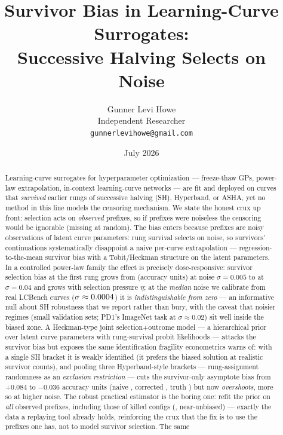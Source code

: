 \documentclass[10pt]{article}
\title{Survivor Bias in Learning-Curve Surrogates:\\
Successive Halving Selects on Noise}
\author{Gunner Levi Howe\\
Independent Researcher\\
\texttt{gunnerlevihowe@gmail.com}}
\date{July 2026}
\begin{document}
\maketitle

\begin{abstract}
Learning-curve surrogates for hyperparameter optimization --- freeze-thaw
GPs, power-law extrapolation, in-context learning-curve networks --- are
fit and deployed on curves that \emph{survived} earlier rungs of
successive halving (SH), Hyperband, or ASHA, yet no method in this line
models the censoring mechanism. We state the honest crux up front:
selection acts on \emph{observed} prefixes, so if prefixes were noiseless
the censoring would be ignorable (missing at random). The bias enters
because prefixes are noisy observations of latent curve parameters: rung
survival selects on noise, so survivors' continuations systematically
disappoint a naive per-curve extrapolation --- regression-to-the-mean
survivor bias with a Tobit/Heckman structure on the latent parameters. In
a controlled power-law family the effect is precisely dose-responsive:
survivor selection bias at the first rung grows from \GateBiasSigLo{}
(accuracy units) at noise $\sigma = 0.005$ to \GateBiasSigXhi{} at
$\sigma = 0.04$ and grows with selection pressure $\eta$; at the
\emph{median} noise we calibrate from real LCBench curves
($\sigma \approx 0.0004$) it is \emph{indistinguishable from zero}
--- an informative null about SH robustness that we report rather than
bury, with the caveat that noisier regimes (small validation sets;
PD1's ImageNet task at $\sigma \approx 0.02$) sit well inside the
biased zone. A Heckman-type joint selection+outcome model --- a
hierarchical prior over latent curve parameters with rung-survival probit
likelihoods --- attacks the survivor bias but exposes the same
identification fragility econometrics warns of: with a single SH bracket
it is weakly identified (it prefers the biased solution at realistic
survivor counts), and pooling three Hyperband-style brackets ---
rung-assignment randomness as an \emph{exclusion restriction} --- cuts the
survivor-only asymptote bias from $+0.084$ to $-0.036$ accuracy units
(naive \PopMuANaive, corrected \PopMuAHeckMB, truth \PopTrueMuA) but now
\emph{overshoots}, more so at higher noise. The robust practical estimator
is the boring one: refit the prior on \emph{all} observed prefixes,
including those of killed configs (\PopMuAEBAll, near-unbiased) --- exactly
the data a replaying tool already holds, reinforcing the crux that the fix
is to use the prefixes one has, not to model survivor selection. The same

\end{abstract}
\end{document}
